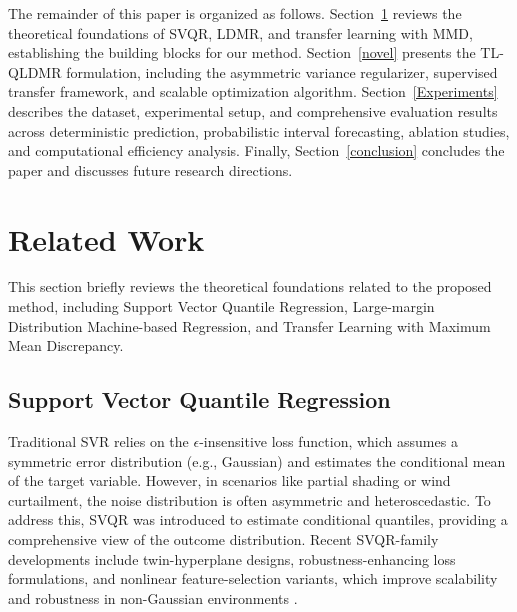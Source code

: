\documentclass[a4paper]{cas-sc}
\begin{document}

The remainder of this paper is organized as follows. Section~\ref{rel} reviews the theoretical foundations of SVQR, LDMR, and transfer learning with MMD, establishing the building blocks for our method. Section~\ref{novel} presents the TL-QLDMR formulation, including the asymmetric variance regularizer, supervised transfer framework, and scalable optimization algorithm. Section~\ref{Experiments} describes the dataset, experimental setup, and comprehensive evaluation results across deterministic prediction, probabilistic interval forecasting, ablation studies, and computational efficiency analysis. Finally, Section~\ref{conclusion} concludes the paper and discusses future research directions.



\section{Related Work}\label{rel}
This section briefly reviews the theoretical foundations related to the proposed method, including Support Vector Quantile Regression, Large-margin Distribution Machine-based Regression, and Transfer Learning with Maximum Mean Discrepancy.

\subsection{Support Vector Quantile Regression}
Traditional SVR relies on the $\epsilon$-insensitive loss function, which assumes a symmetric error distribution (e.g., Gaussian) and estimates the conditional mean of the target variable. However, in scenarios like partial shading or wind curtailment, the noise distribution is often asymmetric and heteroscedastic. To address this, SVQR was introduced to estimate conditional quantiles, providing a comprehensive view of the outcome distribution.
Recent SVQR-family developments include twin-hyperplane designs, robustness-enhancing loss formulations, and nonlinear feature-selection variants, which improve scalability and robustness in non-Gaussian environments \citep{tsvqr2023, wang2024ssvqr, ye2025nfs}.
\end{document}
